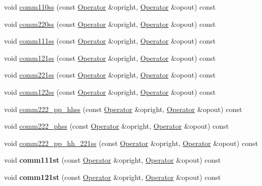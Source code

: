 \begin{DoxyCompactItemize}
\item 
void \hyperlink{classOperator_a132a43b0a4a1a68e8f78af14e1eab069}{comm110ss} (const \hyperlink{classOperator}{Operator} \&opright, \hyperlink{classOperator}{Operator} \&opout) const 
\item 
void \hyperlink{classOperator_aca98d46760c33cd12056701031cc6b4c}{comm220ss} (const \hyperlink{classOperator}{Operator} \&opright, \hyperlink{classOperator}{Operator} \&opout) const 
\item 
void \hyperlink{classOperator_aa99f1f8918be7c5669ba9a60bed3d9cd}{comm111ss} (const \hyperlink{classOperator}{Operator} \&opright, \hyperlink{classOperator}{Operator} \&opout) const 
\item 
void \hyperlink{classOperator_a1180fa3d9923da924aa8d17042c23ed5}{comm121ss} (const \hyperlink{classOperator}{Operator} \&opright, \hyperlink{classOperator}{Operator} \&opout) const 
\item 
void \hyperlink{classOperator_a1a67d9f834722d027cda1525356c436b}{comm221ss} (const \hyperlink{classOperator}{Operator} \&opright, \hyperlink{classOperator}{Operator} \&opout) const 
\item 
void \hyperlink{classOperator_aa47907c535f84e5775b92294a90c2101}{comm122ss} (const \hyperlink{classOperator}{Operator} \&opright, \hyperlink{classOperator}{Operator} \&opout) const 
\item 
void \hyperlink{classOperator_a5f0ebafd8284747ca0dcb35bf2fd4fb0}{comm222\-\_\-pp\-\_\-hhss} (const \hyperlink{classOperator}{Operator} \&opright, \hyperlink{classOperator}{Operator} \&opout) const 
\item 
void \hyperlink{classOperator_ac9b04d839872bbae8dbc5d7e8ee8ab56}{comm222\-\_\-phss} (const \hyperlink{classOperator}{Operator} \&opright, \hyperlink{classOperator}{Operator} \&opout) const 
\item 
void \hyperlink{classOperator_a26be1b965a86598764be26a11490de6b}{comm222\-\_\-pp\-\_\-hh\-\_\-221ss} (const \hyperlink{classOperator}{Operator} \&opright, \hyperlink{classOperator}{Operator} \&opout) const 
\item 
\hypertarget{classOperator_aba1d1f2bee572d9e845711c28487b680}{void {\bfseries comm111st} (const \hyperlink{classOperator}{Operator} \&opright, \hyperlink{classOperator}{Operator} \&opout) const }\label{classOperator_aba1d1f2bee572d9e845711c28487b680}

\item 
\hypertarget{classOperator_a31e74fba9493fc6828402743657c4acf}{void {\bfseries comm121st} (const \hyperlink{classOperator}{Operator} \&opright, \hyperlink{classOperator}{Operator} \&opout) const }\label{classOperator_a31e74fba9493fc6828402743657c4acf}


\end{DoxyCompactItemize}
